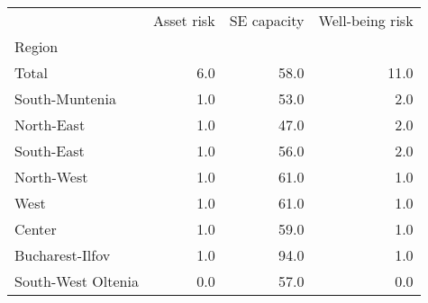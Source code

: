 \begin{tabular}{lrrr}
\toprule
{} &  Asset risk &  SE capacity &  Well-being risk \\
Region             &             &              &                  \\
\midrule
Total              &         6.0 &         58.0 &             11.0 \\
South-Muntenia     &         1.0 &         53.0 &              2.0 \\
North-East         &         1.0 &         47.0 &              2.0 \\
South-East         &         1.0 &         56.0 &              2.0 \\
North-West         &         1.0 &         61.0 &              1.0 \\
West               &         1.0 &         61.0 &              1.0 \\
Center             &         1.0 &         59.0 &              1.0 \\
Bucharest-Ilfov    &         1.0 &         94.0 &              1.0 \\
South-West Oltenia &         0.0 &         57.0 &              0.0 \\
\bottomrule
\end{tabular}
